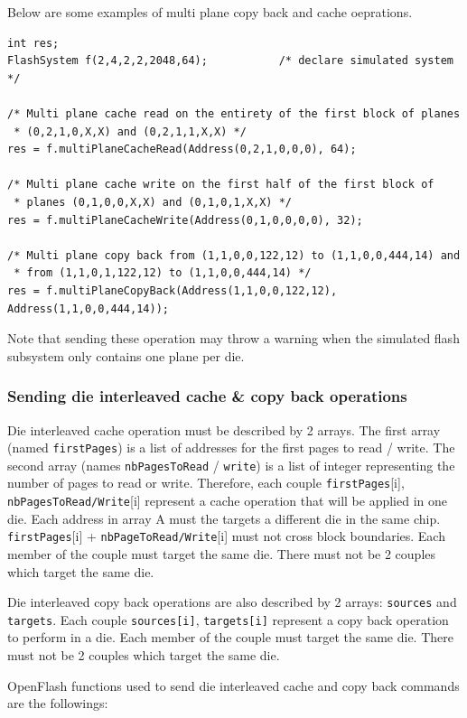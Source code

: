 Below are some examples of multi plane copy back and cache oeprations.

\begin{lstlisting}
int res;
FlashSystem f(2,4,2,2,2048,64);           /* declare simulated system */

/* Multi plane cache read on the entirety of the first block of planes
 * (0,2,1,0,X,X) and (0,2,1,1,X,X) */
res = f.multiPlaneCacheRead(Address(0,2,1,0,0,0), 64);

/* Multi plane cache write on the first half of the first block of 
 * planes (0,1,0,0,X,X) and (0,1,0,1,X,X) */
res = f.multiPlaneCacheWrite(Address(0,1,0,0,0,0), 32);

/* Multi plane copy back from (1,1,0,0,122,12) to (1,1,0,0,444,14) and
 * from (1,1,0,1,122,12) to (1,1,0,0,444,14) */
res = f.multiPlaneCopyBack(Address(1,1,0,0,122,12), Address(1,1,0,0,444,14));
\end{lstlisting}

Note that sending these operation may throw a warning when the simulated flash subsystem only contains one plane per die.

\subsubsection{Sending die interleaved cache \& copy back operations}
Die interleaved cache operation must be described by 2 arrays. The first array (named \verb+firstPages+) is a list of addresses for the first pages to read / write. The second array (names \verb+nbPagesToRead+ / \verb+write+) is a list of integer representing the number of pages to read or write. Therefore, each couple \verb+firstPages+[i], \verb+nbPagesToRead/Write+[i] represent a cache operation that will be applied in one die. Each address in array A must the targets a different die in the same chip. \verb+firstPages+[i] + \verb+nbPageToRead/Write+[i] must not cross block boundaries. Each member of the couple must target the same die. There must not be 2 couples which target the same die.

Die interleaved copy back operations are also described by 2 arrays: \verb+sources+ and \verb+targets+. Each couple \verb+sources[i]+, \verb+targets[i]+ represent a copy back operation to perform in a die. Each member of the couple must target the same die. There must not be 2 couples which target the same die.

OpenFlash functions used to send die interleaved cache and copy back commands are the followings:

